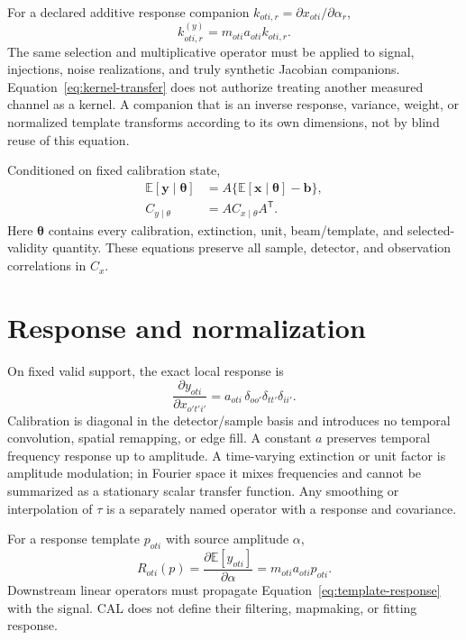 \documentclass[11pt]{article}
\newcommand{\E}{\mathbb{E}}
\begin{document}
For a declared additive response companion
\(k_{oti,r}=\partial x_{oti}/\partial\alpha_r\),
\begin{equation}
  k^{(y)}_{oti,r}=m_{oti}a_{oti}k_{oti,r}.
  \label{eq:kernel-transfer}
\end{equation}
The same selection and multiplicative operator must be applied to signal,
injections, noise realizations, and truly synthetic Jacobian companions.
Equation~\eqref{eq:kernel-transfer} does not authorize treating another
measured channel as a kernel.  A companion that is an inverse response,
variance, weight, or normalized template transforms according to its own
dimensions, not by blind reuse of this equation.

Conditioned on fixed calibration state,
\begin{align}
  \E[\boldsymbol y\mid\boldsymbol\theta]
    &=A\{\E[\boldsymbol x\mid\boldsymbol\theta]-\boldsymbol b\},
  \label{eq:conditional-mean}\\
  C_{y\mid\theta}&=A C_{x\mid\theta}A^{\mathsf T}.
  \label{eq:conditional-covariance}
\end{align}
Here \(\boldsymbol\theta\) contains every calibration, extinction, unit,
beam/template, and selected-validity quantity.  These equations preserve all
sample, detector, and observation correlations in \(C_x\).

\section{Response and normalization}

On fixed valid support, the exact local response is
\begin{equation}
  \frac{\partial y_{oti}}{\partial x_{o't'i'}}
  =a_{oti}\,\delta_{oo'}\delta_{tt'}\delta_{ii'}.
  \label{eq:sample-response}
\end{equation}
Calibration is diagonal in the detector/sample basis and introduces no
temporal convolution, spatial remapping, or edge fill.  A constant \(a\)
preserves temporal frequency response up to amplitude.  A time-varying
extinction or unit factor is amplitude modulation; in Fourier space it mixes
frequencies and cannot be summarized as a stationary scalar transfer
function.  Any smoothing or interpolation of \(\tau\) is a separately named
operator with a response and covariance.

For a response template \(p_{oti}\) with source amplitude \(\alpha\),
\begin{equation}
 R_{oti}(p)=\frac{\partial\E[y_{oti}]}{\partial\alpha}
 =m_{oti}a_{oti}p_{oti}.
 \label{eq:template-response}
\end{equation}
Downstream linear operators must propagate Equation~\eqref{eq:template-response}
with the signal.  CAL does not define their filtering, mapmaking, or fitting
response.
\end{document}
